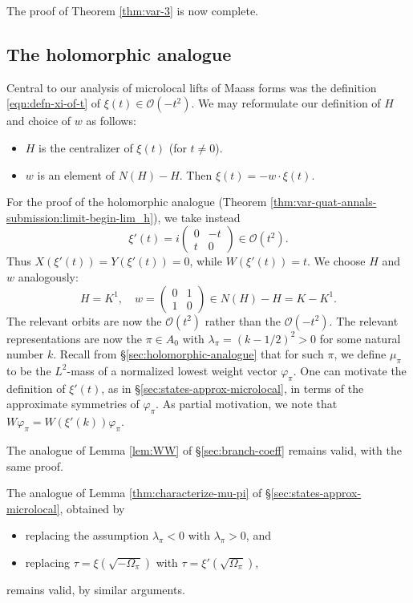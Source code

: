 \documentclass[reqno,10pt]{amsart}
\theoremstyle{plain} %
\theoremstyle{definition}
\theoremstyle{plain} %
\theoremstyle{remark}
\theoremstyle{itplain} %
\theoremstyle{remark} %
\numberwithin{equation}{section}
\begin{document}
The proof of Theorem \ref{thm:var-3} is now complete.

\subsection{The holomorphic analogue}\label{sec:holomorphic-analogue-1}
Central to our analysis of microlocal lifts of Maass forms was the definition \eqref{eqn:defn-xi-of-t} of $\xi(t) \in \mathcal{O}(-t^2)$.  We may reformulate our definition of $H$ and choice of $w$ as follows:
\begin{itemize}
\item $H$ is the centralizer of $\xi(t)$ (for $t \neq 0$).
\item $w$ is an element of $N(H) - H$.  Then $\xi(t) = - w \cdot \xi(t)$.
\end{itemize}

For the proof of the holomorphic analogue (Theorem \ref{thm:var-quat-annals-submission:limit-begin-lim_h}), we take instead
\begin{equation*}
  \xi'(t) = i \begin{pmatrix}
    0 & -t \\
    t & 0
  \end{pmatrix} \in \mathcal{O}(t^2).
\end{equation*}
Thus $X(\xi'(t)) = Y(\xi'(t)) = 0$, while $W(\xi'(t)) = t$.  We choose $H$ and $w$ analogously:
\begin{equation*}
  H = K^1,
  \quad
  w = \begin{pmatrix}
    0 & 1 \\
    1 & 0
  \end{pmatrix}
  \in N(H) - H = K - K^1.
\end{equation*}
The relevant orbits are now the $\mathcal{O}(t^2)$ rather than the $\mathcal{O}(-t^2)$.  The relevant representations are now the $\pi \in A_0$ with $\lambda_\pi  = (k-1/2)^2 > 0$ for some natural number $k$.  Recall from \S\ref{sec:holomorphic-analogue} that for such $\pi$, we define $\mu_\pi$ to be the $L^2$-mass of a normalized lowest weight vector $\varphi_\pi$.  One can motivate the definition of $\xi '(t)$, as in \S\ref{sec:states-approx-microlocal}, in terms of the approximate symmetries of $\varphi_\pi$.  As partial motivation, we note that $W \varphi_\pi = W(\xi '(k)) \varphi_\pi$.


The analogue of Lemma \ref{lem:WW} of \S\ref{sec:branch-coeff} remains valid, with the same proof.

The analogue of Lemma \ref{thm:characterize-mu-pi}  of \S\ref{sec:states-approx-microlocal}, obtained by
\begin{itemize}
\item replacing the assumption $\lambda_\pi < 0$ with $\lambda_\pi > 0$, and
\item replacing $\tau = \xi(\sqrt{- \Omega_\pi })$
  with
  $\tau = \xi'(\sqrt{\Omega_\pi })$,
\end{itemize}
remains valid, by similar arguments.
\end{document}

